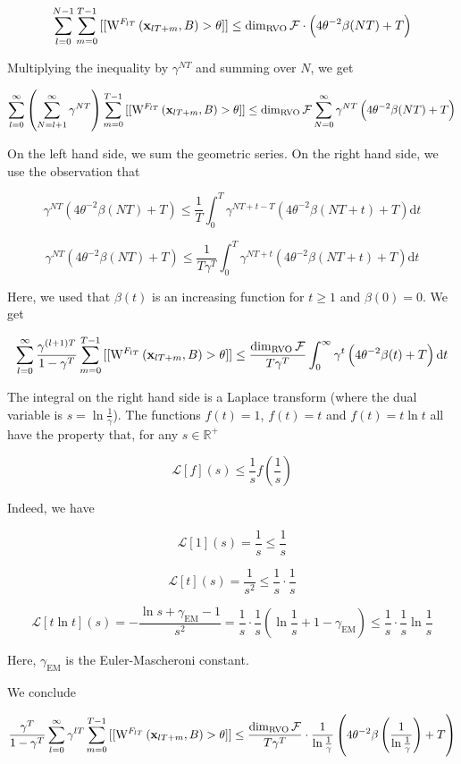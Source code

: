 \documentclass[a4paper]{article}
\newcommand{\AP}[1]{\left(#1\right)}
\newcommand{\D}{\mathrm{d}}
\newcommand{\Reals}{\mathbb{R}}
\newcommand{\B}{B}
\newcommand{\F}{\mathcal{F}}
\DeclareMathOperator{\RVO}{\dim_{RVO}}
\newcommand{\W}{\mathrm{W}}
\begin{document}
$$\sum_{l=0}^{N-1}\sum_{m=0}^{T-1}{[[\W^{F_{lT}}\AP{\bold{x}_{lT+m},\B}>\theta]]} \leq \RVO{\F}\cdot\AP{4\theta^{-2}\beta(NT)+T}$$

Multiplying the inequality by $\gamma^{NT}$ and summing over $N$, we get

$$\sum_{l=0}^{\infty}\AP{\sum_{N=l+1}^\infty \gamma^{NT}}\sum_{m=0}^{T-1}{[[\W^{F_{lT}}\AP{\bold{x}_{lT+m},\B}>\theta]]} \leq \RVO{\F}\sum_{N=0}^\infty\gamma^{NT}\AP{4\theta^{-2}\beta(NT)+T}$$

On the left hand side, we sum the geometric series. On the right hand side, we use the observation that

$$\gamma^{NT}\AP{4\theta^{-2}\beta(NT)+T} \leq \frac{1}{T}\int_0^T \gamma^{NT+t-T}\AP{4\theta^{-2}\beta(NT+t)+T}\D t$$

$$\gamma^{NT}\AP{4\theta^{-2}\beta(NT)+T} \leq \frac{1}{T\gamma^T}\int_0^T \gamma^{NT+t}\AP{4\theta^{-2}\beta(NT+t)+T}\D t$$

Here, we used that $\beta(t)$ is an increasing function for $t\geq 1$ and $\beta(0)=0$. We get

$$\sum_{l=0}^{\infty}\frac{\gamma^{(l+1)T}}{1-\gamma^T}\sum_{m=0}^{T-1}{[[\W^{F_{lT}}\AP{\bold{x}_{lT+m},\B}>\theta]]} \leq \frac{\RVO{\F}}{T\gamma^T}\int_0^\infty\gamma^{t}\AP{4\theta^{-2}\beta(t)+T}\D t$$

The integral on the right hand side is a Laplace transform (where the dual variable is $s=\ln\frac{1}{\gamma}$). The functions $f(t)=1$, $f(t)=t$ and $f(t)=t\ln{t}$ all have the property that, for any $s\in\Reals^+$

$$\mathcal{L}[f](s)\leq \frac{1}{s}f\AP{\frac{1}{s}}$$

Indeed, we have

$$\mathcal{L}[1](s) = \frac{1}{s} \leq \frac{1}{s}$$

$$\mathcal{L}[t](s) = \frac{1}{s^2} \leq \frac{1}{s}\cdot\frac{1}{s}$$

$$\mathcal{L}[t\ln{t}](s) = -\frac{\ln{s}+\gamma_{\text{EM}}-1}{s^2}=\frac{1}{s}\cdot \frac{1}{s}\AP{\ln{\frac{1}{s}}+1-\gamma_{\text{EM}}}\leq\frac{1}{s}\cdot \frac{1}{s}\ln{\frac{1}{s}}$$

Here, $\gamma_{\text{EM}}$ is the Euler-Mascheroni constant.

We conclude

$$\frac{\gamma^T}{1-\gamma^T}\sum_{l=0}^{\infty}\gamma^{lT}\sum_{m=0}^{T-1}{[[\W^{F_{lT}}\AP{\bold{x}_{lT+m},\B}>\theta]]} \leq \frac{\RVO{\F}}{T\gamma^T}\cdot\frac{1}{\ln{\frac{1}{\gamma}}}\AP{4\theta^{-2}\beta\AP{\frac{1}{\ln\frac{1}{\gamma}}}+T}$$
\end{document}
